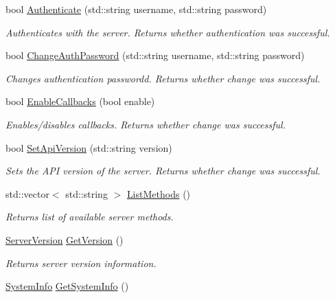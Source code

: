 \begin{DoxyCompactItemize}
\item 
bool \hyperlink{classMethods_aa1bba4d023f013fedf3edff7c69f5d08}{Authenticate} (std\-::string username, std\-::string password)
\begin{DoxyCompactList}\small\item\em Authenticates with the server. Returns whether authentication was successful. \end{DoxyCompactList}\item 
bool \hyperlink{classMethods_a6bef98053e6d6d4f80557be7ce841e80}{Change\-Auth\-Password} (std\-::string username, std\-::string password)
\begin{DoxyCompactList}\small\item\em Changes authentication passwordd. Returns whether change was successful. \end{DoxyCompactList}\item 
bool \hyperlink{classMethods_a9f47416487f6a825133c2d1e01287956}{Enable\-Callbacks} (bool enable)
\begin{DoxyCompactList}\small\item\em Enables/disables callbacks. Returns whether change was successful. \end{DoxyCompactList}\item 
bool \hyperlink{classMethods_ad31d717a19f95d4213d6882a0caff0fa}{Set\-Api\-Version} (std\-::string version)
\begin{DoxyCompactList}\small\item\em Sets the A\-P\-I version of the server. Returns whether change was successful. \end{DoxyCompactList}\item 
std\-::vector$<$ std\-::string $>$ \hyperlink{classMethods_a7833782aa64f9072db30809552f83eef}{List\-Methods} ()
\begin{DoxyCompactList}\small\item\em Returns list of available server methods. \end{DoxyCompactList}\item 
\hyperlink{structServerVersion}{Server\-Version} \hyperlink{classMethods_a674b7c1f53296dca78fb14896b374e1e}{Get\-Version} ()
\begin{DoxyCompactList}\small\item\em Returns server version information. \end{DoxyCompactList}\item 
\hyperlink{structSystemInfo}{System\-Info} \hyperlink{classMethods_a0030583fdad06ab0f2f589b79c904f09}{Get\-System\-Info} ()

\end{DoxyCompactItemize}
